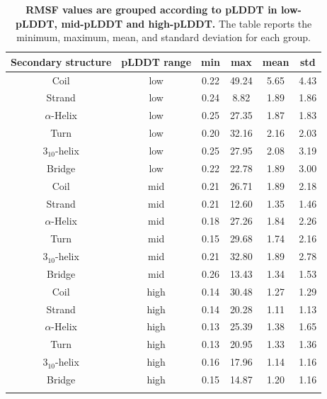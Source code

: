 \begin{table}[H]
\small
\centering
\caption{\textbf{RMSF values are grouped according to pLDDT in low-pLDDT, mid-pLDDT and high-pLDDT.} The table reports the minimum, maximum, mean, and standard deviation for each group.}
\label{tab:plddt_sup:suptable5}
\begin{tabular}{cccccc}
\toprule
Secondary structure & pLDDT range & min & max & mean & std \\ 
\hline
Coil           & low& 0.22 & 49.24 & 5.65 & 4.43 \\ 
Strand         & low& 0.24 & 8.82  & 1.89 & 1.86 \\ 
$\alpha$-Helix & low& 0.25 & 27.35 & 1.87 & 1.83 \\ 
Turn           & low& 0.20 & 32.16 & 2.16 & 2.03 \\ 
$3{_{10}}$-helix      & low& 0.25 & 27.95 & 2.08 & 3.19 \\ 
Bridge         & low& 0.22 & 22.78 & 1.89 & 3.00 \\ 
\arrayrulecolor[gray]{0.8}\hline
Coil           & mid& 0.21 & 26.71 & 1.89 & 2.18 \\ 
Strand         & mid& 0.21 & 12.60  & 1.35 & 1.46 \\ 
$\alpha$-Helix & mid& 0.18 & 27.26 & 1.84 & 2.26 \\ 
Turn           & mid& 0.15 & 29.68 & 1.74 & 2.16 \\ 
$3{_{10}}$-helix      & mid& 0.21 & 32.80  & 1.89 & 2.78 \\ 
Bridge         & mid& 0.26 & 13.43 & 1.34 & 1.53 \\ 
\arrayrulecolor[gray]{0.8}\hline
Coil           & high& 0.14 & 30.48 & 1.27 & 1.29 \\ 
Strand         & high& 0.14 & 20.28 & 1.11 & 1.13 \\ 
$\alpha$-Helix & high& 0.13 & 25.39 & 1.38 & 1.65 \\ 
Turn           & high& 0.13 & 20.95 & 1.33 & 1.36 \\ 
$3{_{10}}$-helix      & high& 0.16 & 17.96 & 1.14 & 1.16 \\
Bridge         & high& 0.15 & 14.87 & 1.20 & 1.16 \\ \arrayrulecolor{black} \bottomrule
\end{tabular}
\end{table}



